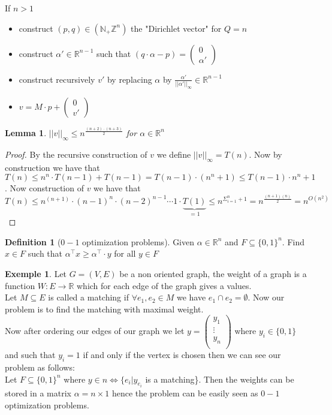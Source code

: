 \documentclass[a4paper,11pt,american]{article}
\newcommand{\N}{\mathbb{N}}
\newcommand{\R}{\mathbb{R}}
\newcommand{\Z}{\mathbb{Z}}
\newcommand{\norm}[1]{\vert\vert#1\vert\vert}
\theoremstyle{plain}
\newtheorem{lemma}[theorem]{Lemma}
\theoremstyle{definition}
\newtheorem{definition}{Definition}
\newtheorem{example}{Exemple}
\begin{document}
If $n>1$\begin{itemize}
    \item construct $(p,q)\in(\N_+\Z^n)$ the "Dirichlet vector" for $Q=n$
    \item construct $\alpha'\in\R^{n-1}$ such that $(q\cdot \alpha-p)=\begin{pmatrix}
        0\\
        \alpha'
    \end{pmatrix}$
    \item construct recursively $v'$ by replacing $\alpha$ by $\frac{\alpha'}{\norm{\alpha'}_{\infty}}\in\R^{n-1}$
    \item $v=M\cdot p +\begin{pmatrix}
        0\\
        v'
    \end{pmatrix}$
\end{itemize} 
\begin{lemma}
    $\norm{v}_\infty\leq n^{\frac{(n+2)\cdot(n+3)}{2}}$ for $\alpha\in\R^n$
\end{lemma}
\begin{proof}
    By the recursive construction of $v$ we define $\norm{v}_\infty=T(n)$. Now by construction we have that $T(n)\leq n^n\cdot T(n-1)+ T(n-1)= T(n-1)\cdot(n^n+1)\leq T(n-1)\cdot n^n+1$. Now construction of $v$ we have that $$T(n)\leq n^{(n+1)}\cdot (n-1)^n\cdot (n-2)^{n-1}\cdots1\cdot \underbrace{T(1)}_{=1 }\leq n^{\Sigma_{i=1}^n+1}=n^{\frac{(n+1)(n)}{2}}=n^{O(n^2)}$$
\end{proof}
\begin{definition}[$0-1$ optimization problems]
 Given $\alpha\in\R^n$ and $F\subseteq\{0,1\}^n$. Find $x\in F$ such that $\alpha^\top x\geq \alpha^\top \cdot y$ for all $y\in F$
\end{definition}
\begin{example}
    Let $G=(V,E)$ be a non oriented graph, the weight of a graph is a function $W:E\rightarrow \R$ which for each edge of the graph gives a values.\\
    Let $M\subseteq E$ is called a matching if $\forall e_1,e_2\in M$ we have $e_1\cap e_2=\emptyset$.
    Now our problem is to find the matching with maximal weight.\\
    Now after ordering our edges of our graph we let $y=\begin{pmatrix}
        y_1\\
        \vdots\\
        y_n\\
    \end{pmatrix}$ where $y_i\in \{0,1\}$ and such that $y_i=1$ if and only if the vertex is chosen then we can see our problem as follows: \\
    Let $F\subseteq \{0,1\}^n$ where $y\in n\iff \{e_i \vert y_{e_i}$ is a matching\}. Then the weights can be stored in a matrix $\alpha=n\times 1$ hence the problem can be easily seen as $0-1$ optimization problems.
\end{example}
\end{document}
